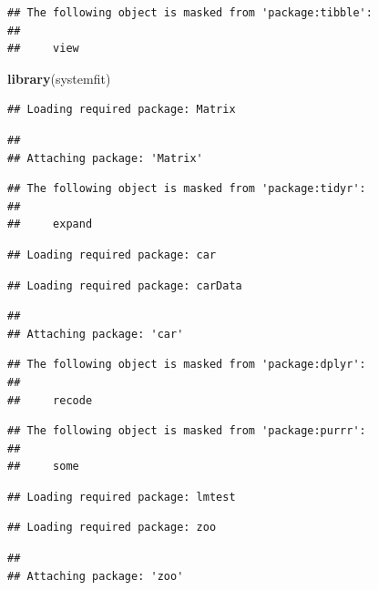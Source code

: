 \documentclass[]{article}
\newenvironment{Shaded}{\begin{snugshade}}{\end{snugshade}}
\newcommand{\KeywordTok}[1]{\textcolor[rgb]{0.13,0.29,0.53}{\textbf{#1}}}
\newcommand{\NormalTok}[1]{#1}
\begin{document}
\begin{verbatim}
## The following object is masked from 'package:tibble':
## 
##     view
\end{verbatim}

\begin{Shaded}
\begin{Highlighting}[]
\KeywordTok{library}\NormalTok{(systemfit)}
\end{Highlighting}
\end{Shaded}

\begin{verbatim}
## Loading required package: Matrix
\end{verbatim}

\begin{verbatim}
## 
## Attaching package: 'Matrix'
\end{verbatim}

\begin{verbatim}
## The following object is masked from 'package:tidyr':
## 
##     expand
\end{verbatim}

\begin{verbatim}
## Loading required package: car
\end{verbatim}

\begin{verbatim}
## Loading required package: carData
\end{verbatim}

\begin{verbatim}
## 
## Attaching package: 'car'
\end{verbatim}

\begin{verbatim}
## The following object is masked from 'package:dplyr':
## 
##     recode
\end{verbatim}

\begin{verbatim}
## The following object is masked from 'package:purrr':
## 
##     some
\end{verbatim}

\begin{verbatim}
## Loading required package: lmtest
\end{verbatim}

\begin{verbatim}
## Loading required package: zoo
\end{verbatim}

\begin{verbatim}
## 
## Attaching package: 'zoo'
\end{verbatim}
\end{document}

